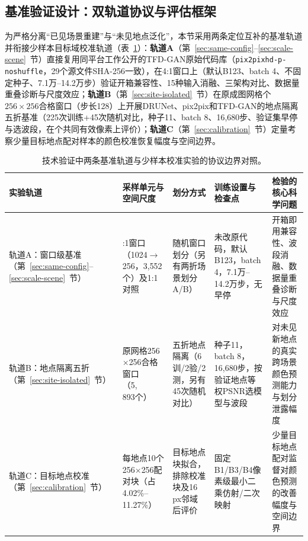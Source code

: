 \documentclass[UTF8,a4paper,10pt]{ctexart}
\begin{document}
\subsection{基准验证设计：双轨道协议与评估框架}\label{sec:bench-overview}
为严格分离“已见场景重建”与“未见地点泛化”，本节采用两条定位互补的基准轨道并衔接少样本目标域校准轨道（表~\ref{tab:bench-tracks-zh}）：\textbf{轨道A}（第~\ref{sec:same-config}--\ref{sec:scale-scene}~节）直接复用同平台工作\cite{chen2026thesis}公开的TFD-GAN原始代码库（\texttt{pix2pixhd-p-noshuffle}，29个源文件SHA-256一致），在4:1窗口上（默认B123、batch 4、不固定种子、7.1万--14.2万步）验证开箱兼容性、15种输入消融、三架构对比、数据量重叠诊断与尺度效应；\textbf{轨道B}（第~\ref{sec:site-isolated}~节）在原成图网格\QualifiedWindowCount{}个$256\times256$合格窗口（步长128）上开展DRUNet、pix2pix和TFD-GAN的地点隔离五折基准（225次训练+45次随机对比，种子11、batch 8、16{,}680步、验证集早停与选波段，在\SupportPixelCount{}个共同有效像素上评价）；\textbf{轨道C}（第~\ref{sec:calibration}~节）定量考察少量目标地点配对样本的颜色校准恢复幅度与空间边界。

\begin{table}[htbp]\centering\small
\caption{技术验证中两条基准轨道与少样本校准实验的协议边界对照。}\label{tab:bench-tracks-zh}
\begin{tabularx}{\textwidth}{@{}>{\raggedright\arraybackslash}p{}>{\raggedright\arraybackslash}p{}>{\raggedright\arraybackslash}p{}>{\raggedright\arraybackslash}p{}>{\raggedright\arraybackslash}X@{}}
\toprule
实验轨道 & 采样单元与空间尺度 & 划分方式 & 训练设置与检查点 & 检验的核心科学问题\\
\midrule
轨道A：窗口级基准（第~\ref{sec:same-config}--\ref{sec:scale-scene}~节） & 4:1窗口（1024$\to$256，3{,}552个）及1:1对照 & 随机窗口划分（另有两折场景划分A/B） & 未改原代码，默认B123，batch 4，7.1万--14.2万步，无早停 & 开箱即用兼容性、波段消融、数据量重叠诊断与尺度效应\\
轨道B：地点隔离五折（第~\ref{sec:site-isolated}~节） & 原网格256$\times$256合格窗口（5{,}893个） & 五折地点隔离（6训/2验/2测，另有45次随机对比） & 种子11，batch 8，16{,}680步，按验证地点等权PSNR选模型与波段 & 对未见新地点的真实跨场景颜色预测能力与划分泄露幅度\\
轨道C：目标地点校准（第~\ref{sec:calibration}~节） & 每地点10个256$\times$256配对块（占4.02\%--11.27\%） & 目标地点块拟合，排除校准块及16\,px邻域后评价 & 固定B1/B3/B4像素级最小二乘仿射/二次映射 & 少量目标地点配对监督对颜色预测的改善幅度与空间边界\\
\bottomrule
\end{tabularx}
\end{table}
\end{document}
